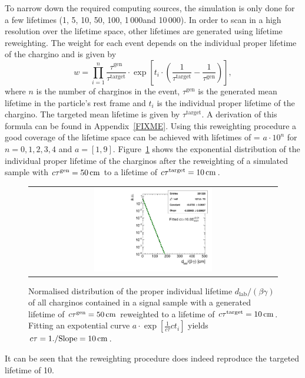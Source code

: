 To narrow down the required computing sources, the simulation is only done for a few lifetimes (1\cm, 5\cm, 10\cm, 50\cm, 100\cm, 1\,000\cm and 10\,000\cm).
In order to scan in a high resolution over the lifetime space, other lifetimes are generated using lifetime reweighting.
The weight for each event depends on the individual proper lifetime of the chargino and is given by
\begin{equation*}
w = \prod_{i=1}^n \frac{\tau^{\text{gen}}}{\tau^{\text{target}}}\cdot  \exp \left[ t_i \cdot \left( \frac{1}{\tau^{\text{target}}} - \frac{1}{\tau^{\text{gen}}} \right) \right] ,
\end{equation*}
where $n$ is the  number of charginos in the event, $\tau^{\text{gen}}$ is the generated mean lifetime in the particle's rest frame and $t_i$ is the individual proper lifetime of the chargino. 
The targeted mean lifetime is given by $\tau^{\text{target}}$. 
A derivation of this formula can be found in Appendix~\ref{FIXME}.
Using this reweighting procedure a good coverage of the lifetime space can be achieved with lifetimes of \ctau = $a\cdot10^{n}$ for $n=0,1,2,3,4$ and $a=\left[1,9\right]$.
Figure~\ref{fig:LifetimeReweighting} shows the exponential distribution of the individual proper lifetime of the charginos after the reweighting of a simulated sample with $c\tau^{\text{gen}}=50\,\text{cm}$ to a lifetime of $c\tau^{\text{target}}=10\,\text{cm}$.
\begin{figure}[!t]
  \centering 
  \begin{tabular}{c}
    \includegraphics[width=0.49\textwidth]{figures/analysis/10cm.pdf}
  \end{tabular}
  \caption{Normalised distribution of the proper individual lifetime $d_{\text{lab}}/\left(\beta\gamma \right)$ of all charginos contained in a signal sample with a generated lifetime of $c\tau^{\text{gen}}=50\,\text{cm}$ reweighted to a lifetime of $c\tau^{\text{target}}=10\,\text{cm}$. Fitting an expotential curve $a\cdot \exp\left[\frac{1}{c \tau } c t_i\right]$ yields $c\tau=1./\text{Slope}=10\,\text{cm}$.}
  \label{fig:LifetimeReweighting}
\end{figure}
It can be seen that the reweighting procedure does indeed reproduce the targeted lifetime of 10\cm.


